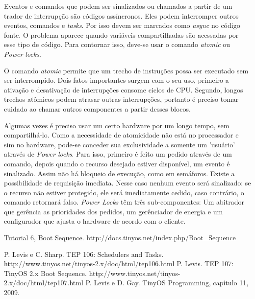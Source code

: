 \documentclass[a4paper,onecolumn, 10pt]{article}
\begin{document}
Eventos e comandos que podem ser sinalizados ou chamados a partir de um trador de interrupção são códigos assíncronos. Eles podem interromper outros eventos, comandos e \textit{tasks}. Por isso devem ser marcados como \textit{async} no código fonte. O problema aparece quando variáveis compartilhadas são acessadas por esse tipo de código. Para contornar isso, deve-se usar o comando \textit{atomic} ou \textit{Power locks}.

O comando \textit{atomic} permite que um trecho de instruções possa ser executado sem ser interrompido. Dois fatos importantes surgem com o seu uso, primeiro a ativação e desativação de interrupções consome ciclos de CPU. Segundo, longos trechos atômicos podem atrasar outras interrupções, portanto é preciso tomar cuidado ao chamar outros componentes a partir desses blocos.

Algumas vezes\cite{tep106} é preciso usar um certo hardware por um longo tempo, sem compartilhá-lo. Como a necessidade de atomicidade não está no processador e sim no hardware, pode-se conceder sua exclusividade a somente um 'usuário' através de \textit{Power locks}. Para isso, primeiro é feito um pedido através de um comando, depois quando o recurso desejado estiver disponível, um evento é sinalizado. Assim não há bloqueio de execução, como em semáforos. Existe a possibilidade de requisição imediata. Nesse caso nenhum evento será sinalizado: se o recurso não estiver protegido, ele será imediatamente cedido, caso contrário, o comando retornará falso. \textit{Power Locks} têm três sub-componentes: Um abitrador que gerência as prioridades dos pedidos, um gerênciador de energia e um configurador que ajusta o hardware de acordo com o cliente.

\pagebreak

\begin{thebibliography}{99}

 Tutorial 6, Boot Sequence. \url{ http://docs.tinyos.net/index.php/Boot_Sequence }

 P. Levis e C. Sharp. TEP 106: Schedulers and Tasks. http://www.tinyos.net/tinyos-2.x/doc/html/tep106.html
 P. Levis. TEP 107: TinyOS 2.x Boot Sequence. http://www.tinyos.net/tinyos-2.x/doc/html/tep107.html
 P. Levis e D. Gay. TinyOS Programming, capítulo 11, 2009.
\end{thebibliography}
\end{document}

